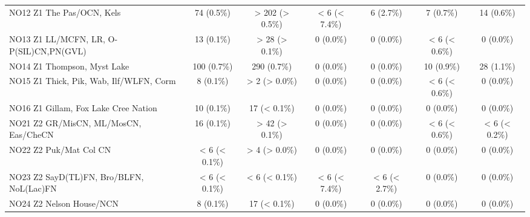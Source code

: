 \documentclass{article}
\begin{document}
\begin{table}[htbp]
\begin{longtable}{l*{6}{c}}
  NO12 Z1 The Pas/OCN, Kels                             &            74 (0.5\%)           &         > 202 (> 0.5\%)         &          < 6 (< 7.4\%)          &            6 (2.7\%)            &            7 (0.7\%)            &            14 (0.6\%)           \\
  NO13 Z1 LL/MCFN, LR, O-P(SIL)CN,PN(GVL)               &            13 (0.1\%)           &          > 28 (> 0.1\%)         &            0 (0.0\%)            &            0 (0.0\%)            &          < 6 (< 0.6\%)          &            0 (0.0\%)            \\
  NO14 Z1 Thompson, Myst Lake                           &           100 (0.7\%)           &           290 (0.7\%)           &            0 (0.0\%)            &            0 (0.0\%)            &            10 (0.9\%)           &            28 (1.1\%)           \\
  NO15 Z1 Thick, Pik, Wab, Ilf/WLFN, Corm               &            8 (0.1\%)            &          > 2 (> 0.0\%)          &            0 (0.0\%)            &            0 (0.0\%)            &          < 6 (< 0.6\%)          &            0 (0.0\%)            \\
  NO16 Z1 Gillam, Fox Lake Cree Nation                  &            10 (0.1\%)           &           17 (< 0.1\%)          &            0 (0.0\%)            &            0 (0.0\%)            &            0 (0.0\%)            &            0 (0.0\%)            \\
  NO21 Z2 GR/MisCN, ML/MosCN, Eas/CheCN                 &            16 (0.1\%)           &          > 42 (> 0.1\%)         &            0 (0.0\%)            &            0 (0.0\%)            &          < 6 (< 0.6\%)          &          < 6 (< 0.2\%)          \\
  NO22 Z2 Puk/Mat Col CN                                &          < 6 (< 0.1\%)          &          > 4 (> 0.0\%)          &            0 (0.0\%)            &            0 (0.0\%)            &            0 (0.0\%)            &            0 (0.0\%)            \\
  NO23 Z2 SayD(TL)FN, Bro/BLFN, NoL(Lac)FN              &          < 6 (< 0.1\%)          &          < 6 (< 0.1\%)          &          < 6 (< 7.4\%)          &          < 6 (< 2.7\%)          &            0 (0.0\%)            &            0 (0.0\%)            \\
  NO24 Z2 Nelson House/NCN                              &            8 (0.1\%)            &           17 (< 0.1\%)          &            0 (0.0\%)            &            0 (0.0\%)            &            0 (0.0\%)            &            0 (0.0\%)            \\

\end{longtable}
\end{table}
\end{document}
